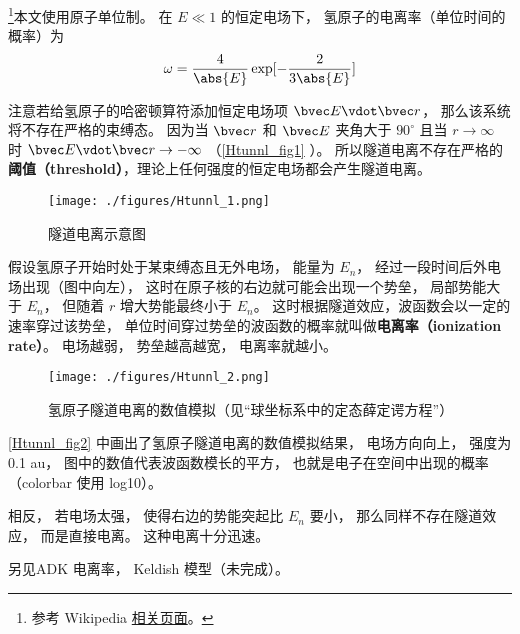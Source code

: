 

\footnote{参考 Wikipedia \href{https://en.wikipedia.org/wiki/Tunnel_ionization}{相关页面}。}本文使用原子单位制。 在 $E \ll 1$ 的恒定电场下， 氢原子的电离率（单位时间的概率）为
\begin{equation}
\omega = \frac{4}{\abs{E}} \exp[-\frac{2}{3\abs{E}}]
\end{equation}

注意若给氢原子的哈密顿算符添加恒定电场项 $\bvec E \vdot \bvec r$， 那么该系统将不存在严格的束缚态。 因为当 $\bvec r$ 和 $\bvec E$ 夹角大于 $90^\circ$ 且当 $r\to\infty$ 时 $\bvec E \vdot \bvec r \to -\infty$ （\autoref{Htunnl_fig1} ）。 所以隧道电离不存在严格的\textbf{阈值（threshold）}，理论上任何强度的恒定电场都会产生隧道电离。

\begin{figure}[ht]
\centering
\texttt{[image: ./figures/Htunnl\_1.png]}
\caption{隧道电离示意图} \label{Htunnl_fig1}
\end{figure}

假设氢原子开始时处于某束缚态且无外电场， 能量为 $E_n$， 经过一段时间后外电场出现（图中向左）， 这时在原子核的右边就可能会出现一个势垒， 局部势能大于 $E_n$， 但随着 $r$ 增大势能最终小于 $E_n$。 这时根据隧道效应，波函数会以一定的速率穿过该势垒， 单位时间穿过势垒的波函数的概率就叫做\textbf{电离率（ionization rate）}。 电场越弱， 势垒越高越宽， 电离率就越小。

\begin{figure}[ht]
\centering
\texttt{[image: ./figures/Htunnl\_2.png]}
\caption{氢原子隧道电离的数值模拟（见“球坐标系中的定态薛定谔方程”）} \label{Htunnl_fig2}
\end{figure}
\autoref{Htunnl_fig2} 中画出了氢原子隧道电离的数值模拟结果， 电场方向向上， 强度为 0.1 au， 图中的数值代表波函数模长的平方， 也就是电子在空间中出现的概率（colorbar 使用 log10）。

相反， 若电场太强， 使得右边的势能突起比 $E_n$ 要小， 那么同样不存在隧道效应， 而是直接电离。 这种电离十分迅速。

另见ADK 电离率， Keldish 模型（未完成）。

